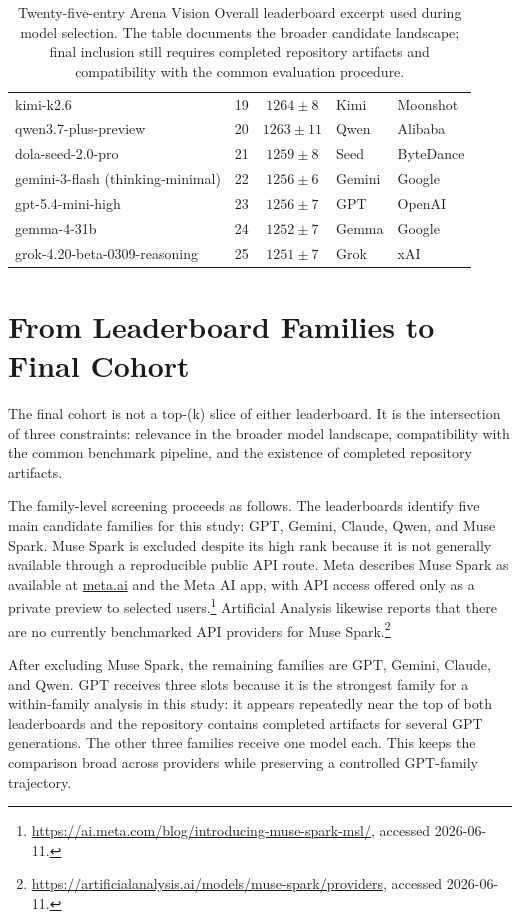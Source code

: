 \documentclass[11pt,a4paper]{report}
\begin{document}
\begin{table}[H]
{\begin{tabular}{l c c l l}
kimi-k2.6
& 19 & $1264 \pm 8$ & Kimi & Moonshot \\
qwen3.7-plus-preview
& 20 & $1263 \pm 11$ & Qwen & Alibaba \\
dola-seed-2.0-pro
& 21 & $1259 \pm 8$ & Seed & ByteDance \\
gemini-3-flash (thinking-minimal)
& 22 & $1256 \pm 6$ & Gemini & Google \\
gpt-5.4-mini-high
& 23 & $1256 \pm 7$ & GPT & OpenAI \\
gemma-4-31b
& 24 & $1252 \pm 7$ & Gemma & Google \\
grok-4.20-beta-0309-reasoning
& 25 & $1251 \pm 7$ & Grok & xAI \\
\bottomrule
\end{tabular}
}
\caption{Twenty-five-entry Arena Vision Overall leaderboard excerpt used during
model selection. The table documents the broader candidate landscape; final
inclusion still requires completed repository artifacts and compatibility with
the common evaluation procedure.}
\label{tab:arena-vision-context}
\end{table}

\section{From Leaderboard Families to Final Cohort}

The final cohort is not a top-(k) slice of either leaderboard. It is the
intersection of three constraints: relevance in the broader model landscape,
compatibility with the common benchmark pipeline, and the existence of
completed repository artifacts.

The family-level screening proceeds as follows. The leaderboards identify five
main candidate families for this study: GPT, Gemini, Claude, Qwen, and Muse
Spark. Muse Spark is excluded despite its high rank because it is not generally
available through a reproducible public API route. Meta describes Muse Spark as
available at \url{meta.ai} and the Meta AI app, with API access offered only as
a private preview to selected users.\footnote{\url{https://ai.meta.com/blog/introducing-muse-spark-msl/}, accessed 2026-06-11.}
Artificial Analysis likewise reports that there are no currently benchmarked
API providers for Muse Spark.\footnote{\url{https://artificialanalysis.ai/models/muse-spark/providers}, accessed 2026-06-11.}

After excluding Muse Spark, the remaining families are GPT, Gemini, Claude, and
Qwen. GPT receives three slots because it is the strongest family for a
within-family analysis in this study: it appears repeatedly near the top of both
leaderboards and the repository contains completed artifacts for several GPT
generations. The other three families receive one model each. This keeps the
comparison broad across providers while preserving a controlled GPT-family
trajectory.
\end{document}
